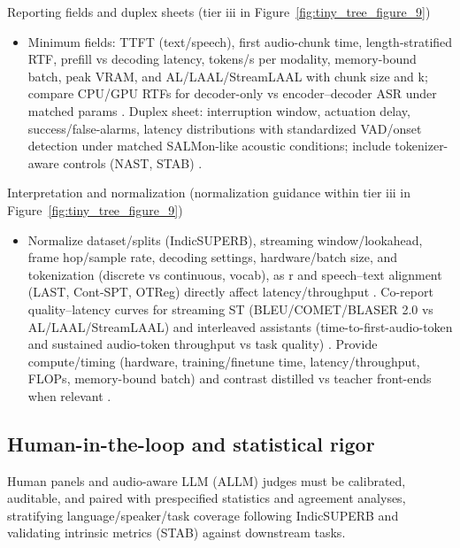 \documentclass{article}
\begin{document}
Reporting fields and duplex sheets (tier iii in Figure~\ref{fig:tiny_tree_figure_9})
\begin{itemize}
  \item Minimum fields: TTFT (text/speech), first audio-chunk time, length-stratified RTF, prefill vs decoding latency, tokens/s per modality, memory-bound batch, peak VRAM, and AL/LAAL/StreamLAAL with chunk size and k; compare CPU/GPU RTFs for decoder-only vs encoder--decoder ASR under matched params \cite{tsunoo2024decoderonlyarchitecturespeechrecognition}. Duplex sheet: interruption window, actuation delay, success/false-alarms, latency distributions with standardized VAD/onset detection under matched SALMon-like acoustic conditions; include tokenizer-aware controls (NAST, STAB) \cite{messica2024nastnoiseawarespeechtokenizationlanguage,maimon2025salmonsuiteacousticlanguagemodelevaluati,vashishth2024stabspeechtokenizerassessmentbenchmark}.
\end{itemize}

Interpretation and normalization (normalization guidance within tier iii in Figure~\ref{fig:tiny_tree_figure_9})
\begin{itemize}
  \item Normalize dataset/splits (IndicSUPERB), streaming window/lookahead, frame hop/sample rate, decoding settings, hardware/batch size, and tokenization (discrete vs continuous, vocab), as r and speech--text alignment (LAST, Cont-SPT, OTReg) directly affect latency/throughput \cite{turetzky2024lastlanguagemodelawarespeechtokenization,li2025continuousspeechtokenizertext,xu2025optimaltransportregularizationspeechtext}. Co-report quality--latency curves for streaming ST (BLEU/COMET/BLASER 2.0 vs AL/LAAL/StreamLAAL) and interleaved assistants (time-to-first-audio-token and sustained audio-token throughput vs task quality) \cite{maimon2025scalinganalysisinterleavedspeechtextlang,guo2025streamuniachievingstreamingspeechtransla,chen2024bestowefficientstreamablespeechlanguagem,zhao2024textlessstreamingspeechtranslationsemant}. Provide compute/timing (hardware, training/finetune time, latency/throughput, FLOPs, memory-bound batch) and contrast distilled vs teacher front-ends when relevant \cite{maimon2025slammingtrainingspeechlanguagemodelonegp}.
\end{itemize}

\subsection{Human-in-the-loop and statistical rigor} \label{subsec:human-in-the-loopandstatisticalrigor}
Human panels and audio-aware LLM (ALLM) judges must be calibrated, auditable, and paired with prespecified statistics and agreement analyses, stratifying language/speaker/task coverage following IndicSUPERB and validating intrinsic metrics (STAB) against downstream tasks.
\end{document}
